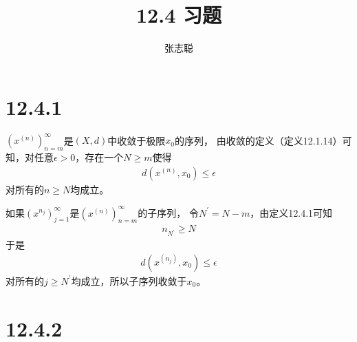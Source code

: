 \documentclass{article}
\begin{document}
\title{12.4 习题}
\author{张志聪}
\maketitle

\section*{12.4.1}

$(x^{(n)})_{n = m}^\infty$是$(X,d)$中收敛于极限$x_0$的序列，
由收敛的定义（定义12.1.14）可知，对任意$\epsilon > 0$，存在一个$N \geq m$使得
\begin{align*}
  d(x^{(n)},x_0) \leq \epsilon
\end{align*}
对所有的$n \geq N$均成立。

如果$(x^{n_j})_{j=1}^\infty$是$(x^{(n)})_{n = m}^\infty$的子序列，
令$N^\prime = N - m$，由定义12.4.1可知
\begin{align*}
  n_{N^\prime} \geq N
\end{align*}
于是
\begin{align*}
  d(x^{(n_j)}, x_0) \leq \epsilon
\end{align*}
对所有的$j \geq N^\prime$均成立，所以子序列收敛于$x_0$。

\section*{12.4.2}
\end{document}
